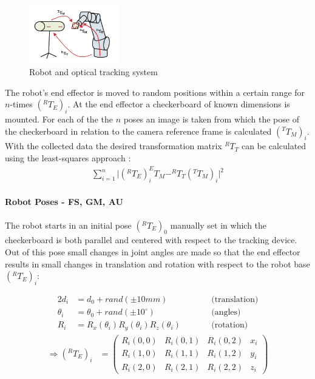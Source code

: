 \documentclass[conference]{IEEEtran}
\begin{document}
\begin{figure}[!h]
	\centering
	\includegraphics[width=0.35\textwidth]{figures/robot_tracker.png}
	\caption{Robot and optical tracking system \cite{ernst2012non}}
	\label{fig:robtrac}
\end{figure}
The robot's end effector is moved to random positions within a certain range for \(n\)-times \((^RT_E)_i\). At the end effector a checkerboard of known dimensions is mounted. For each of the the \(n\) poses an image is taken from which the pose of the checkerboard in relation to the camera reference frame is calculated \((^TT_M)_i\). With the collected data the desired transformation matrix \(^RT_T\) can be calculated using the least-squares approach \cite{ernst2012non}:
\begin{align*}
    \sum_{i=1}^n{\big|(^RT_E)_i ^ET_M - ^RT_T (^TT_M)_i\big|^2}
\end{align*}

\paragraph{Robot Poses - FS, GM, AU}
The robot starts in an initial pose \((^RT_E)_0\) manually set in which the checkerboard is both parallel and centered with respect to the tracking device. Out of this pose small changes in joint angles are made so that the end effector results in small changes in translation and rotation with respect to the robot base \((^RT_E)_i\):

\begin{alignat*}{2}
    d_i &= d_0 + \textit{rand}(\pm 10mm) &\qquad &\text{(translation)}\\
    \theta_i &= \theta_0 + \textit{rand}(\pm 10^\circ) &\qquad &\text{(angles)}\\
    R_i &= R_x(\theta _i)R_y(\theta _i)R_z(\theta _i) &\qquad &\text{(rotation)}
\end{alignat*}
\begin{align*}
\Rightarrow (^RT_E)_i &= \begin{pmatrix}R_i(0,0) & R_i(0,1) & R_i(0,2) & x_i\\
                                         R_i(1,0) & R_i(1,1) & R_i(1,2) & y_i\\
                                         R_i(2,0) & R_i(2,1) & R_i(2,2) & z_i
                                         \end{pmatrix}
\end{align*}
\end{document}

